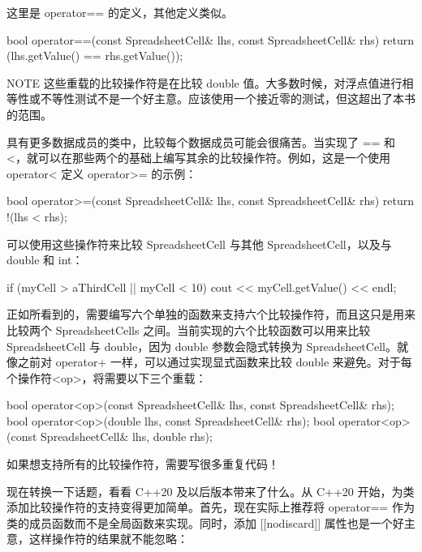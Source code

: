 这里是 operator== 的定义，其他定义类似。

\begin{cpp}
bool operator==(const SpreadsheetCell& lhs, const SpreadsheetCell& rhs)
{
    return (lhs.getValue() == rhs.getValue());
}
\end{cpp}

\begin{myNotic}{NOTE}
这些重载的比较操作符是在比较 double 值。大多数时候，对浮点值进行相等性或不等性测试不是一个好主意。应该使用一个接近零的测试，但这超出了本书的范围。
\end{myNotic}

具有更多数据成员的类中，比较每个数据成员可能会很痛苦。当实现了 == 和 <，就可以在那些两个的基础上编写其余的比较操作符。例如，这是一个使用 operator< 定义 operator>= 的示例：

\begin{cpp}
bool operator>=(const SpreadsheetCell& lhs, const SpreadsheetCell& rhs)
{
    return !(lhs < rhs);
}
\end{cpp}

可以使用这些操作符来比较 SpreadsheetCell 与其他 SpreadsheetCell，以及与 double 和 int：

\begin{cpp}
if (myCell > aThirdCell || myCell < 10) {
    cout << myCell.getValue() << endl;
}
\end{cpp}

正如所看到的，需要编写六个单独的函数来支持六个比较操作符，而且这只是用来比较两个 SpreadsheetCells 之间。当前实现的六个比较函数可以用来比较 SpreadsheetCell 与 double，因为 double 参数会隐式转换为 SpreadsheetCell。就像之前对 operator+ 一样，可以通过实现显式函数来比较 double 来避免。对于每个操作符<op>，将需要以下三个重载：

\begin{cpp}
bool operator<op>(const SpreadsheetCell& lhs, const SpreadsheetCell& rhs);
bool operator<op>(double lhs, const SpreadsheetCell& rhs);
bool operator<op>(const SpreadsheetCell& lhs, double rhs);
\end{cpp}

如果想支持所有的比较操作符，需要写很多重复代码！


现在转换一下话题，看看 C++20 及以后版本带来了什么。从 C++20 开始，为类添加比较操作符的支持变得更加简单。首先，现在实际上推荐将 operator== 作为类的成员函数而不是全局函数来实现。同时，添加 [[nodiscard]] 属性也是一个好主意，这样操作符的结果就不能忽略：

